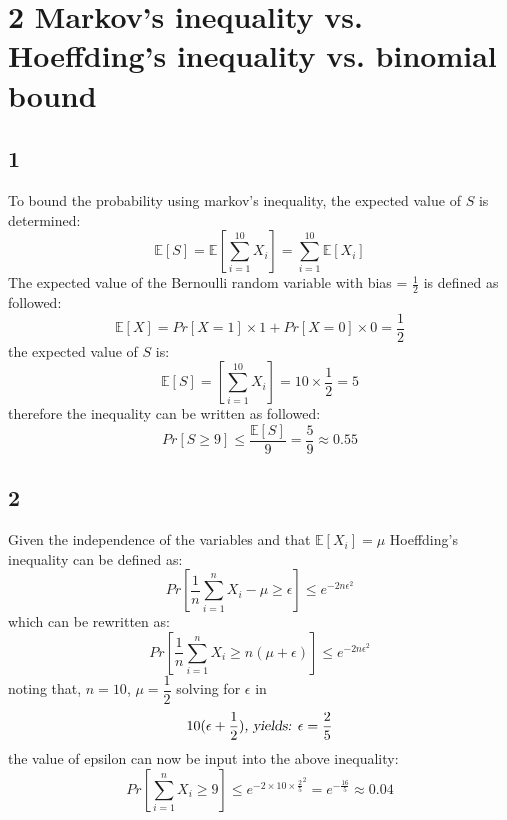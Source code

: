 \documentclass{article}
\begin{document}
\section{2 Markov's inequality vs. Hoeffding's inequality vs. binomial bound}
\subsection{1}
To bound the probability using markov's inequality, the expected value of $S$ is determined:\\
\begin{equation*}
\mathbb{E}[S] = \mathbb{E} \left[\sum\limits^{10}_{i=1}X_i\right] = \sum\limits^{10}_{i=1} \mathbb{E}[X_i]
\end{equation*}
The expected value of the Bernoulli random variable with bias = $\frac{1}{2}$ is defined as followed:
\begin{equation*}
\mathbb{E}[X] = Pr[X=1] \times 1 + Pr[X=0] \times 0 = \dfrac{1}{2}
\end{equation*}
the expected value of $S$ is:
\begin{equation*}
\mathbb{E}[S]= \left[\sum\limits^{10}_{i=1}X_i\right] = 10 \times \dfrac{1}{2} = 5
\end{equation*}
therefore the inequality can be written as followed:
\begin{equation*}
Pr[S \geq 9] \leq \dfrac{\mathbb{E}[S]}{9} = \dfrac{5}{9} \approx 0.55
\end{equation*}
\subsection{2}
Given the independence of the variables and that $ \mathbb{E}[X_i] = \mu $
Hoeffding's inequality can be defined as:
\begin{equation*}
Pr\left[ \dfrac{1}{n} \sum\limits^{n}_{i=1}X_i - \mu \geq \epsilon \right]
\leq e^{-2n\epsilon^2}
\end{equation*}
which can be rewritten as:
\begin{equation*}
Pr\left[ \dfrac{1}{n} \sum\limits^{n}_{i=1}X_i \geq n(\mu + \epsilon) \right]
\leq e^{-2n\epsilon^2}
\end{equation*}
noting that, $n=10$, $\mu= \dfrac{1}{2}$ solving for $\epsilon$ in\\
$$ 10(\epsilon+ \dfrac{1}{2}) \textsl{, yields: } \epsilon=\dfrac{2}{5} $$
the value of epsilon can now be input into the above inequality:
\begin{equation*}
Pr \left[ \sum\limits^{n}_{i=1}X_i \geq 9 \right] \leq e^{-2 \times 10 \times \frac{2}{5}^2} = e^{-\frac{16}{5}}  \approx 0.04
\end{equation*}
\end{document}
